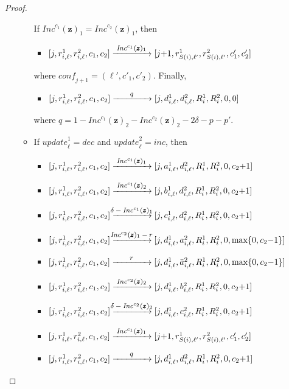 \documentclass[a4paper,UKenglish,cleveref, autoref, thm-restate]{lipics-v2021}
\newcommand{\tran}[1]{\xrightarrow{\makebox[4em]{\footnotesize$#1$}}}
\newcommand{\INC}{\mathit{Inc}}
\renewcommand{\vec}[1]{\pmb{#1}}
\newcommand{\update}{\textit{update}}
\newcommand{\Dec}{\textit{dec}}
\newcommand{\Inc}{\textit{inc}}
\newcommand{\conf}{\textit{conf}}
\newcommand{\vv}[1]{\INC^{#1}(\vec{z})}
\begin{document}
\begin{proof}
\begin{itemize}
\begin{itemize}
        If $\vv{c_1}_1 = \vv{c_2}_1$, then
        \begin{itemize} 
            \item $[j,r^1_{i,\ell},r^2_{i,\ell},c_1,c_2] \tran{\vv{c_1}_1}  [j{+}1,r^1_{S(i),\ell'},r^2_{S(i),\ell'},c'_1,c'_2]$
           \end{itemize}
        where $\conf_{j+1}= (\ell',c'_1,c'_2)$. Finally,
        \begin{itemize}
            \item $[j,r^1_{i,\ell},r^2_{i,\ell},c_1,c_2] \tran{q} [j,d^1_{i,\ell},d^2_{i,\ell},R_i^1,R_i^2,0,0]$    
         \end{itemize}  
        where $q = 1 - \vv{c_1}_2 - \vv{c_2}_2 - 2\delta - p - p'$.
    \item If $\update_\ell^1 = \Dec$ and $\update_\ell^2 = \Inc$, then
        \begin{itemize}
         \item $[j,r^1_{i,\ell},r^2_{i,\ell},c_1,c_2] \tran{\vv{c_1}_1} 
                [j,a^1_{i,\ell},d^2_{i,\ell},R_i^1,R_i^2,0,c_2{+}1]$
         \item $[j,r^1_{i,\ell},r^2_{i,\ell},c_1,c_2] \tran{\vv{c_1}_2} 
                [j,b^1_{i,\ell},d^2_{i,\ell},R_i^1,R_i^2,0,c_2{+}1]$    
         \item $[j,r^1_{i,\ell},r^2_{i,\ell},c_1,c_2] \tran{\delta- \vv{c_1}_1}
                [j,c^1_{i,\ell},d^2_{i,\ell},R_i^1,R_i^2,0,c_2{+}1]$
\item $[j,r^1_{i,\ell},r^2_{i,\ell},c_1,c_2] \tran{\vv{c_2}_1 - r} 
                [j,d^1_{i,\ell},a^2_{i,\ell},R_i^1,R_i^2,0,\max\{0,c_2{-}1\}]$
         \item $[j,r^1_{i,\ell},r^2_{i,\ell},c_1,c_2] \tran{r} 
                [j,d^1_{i,\ell},\bar{a}^2_{i,\ell},R_i^1,R_i^2,0,\max\{0,c_2{-}1\}]$
         \item $[j,r^1_{i,\ell},r^2_{i,\ell},c_1,c_2] \tran{\vv{c_2}_2} 
                [j,d^1_{i,\ell},b^2_{i,\ell},R_i^1,R_i^2,0,c_2{+}1]$    
         \item $[j,r^1_{i,\ell},r^2_{i,\ell},c_1,c_2] \tran{\delta- \vv{c_2}_2} 
                [j,d^1_{i,\ell},c^2_{i,\ell},R_i^1,R_i^2,0,c_2{+}1]$
         \item $[j,r^1_{i,\ell},r^2_{i,\ell},c_1,c_2] \tran{\vv{c_1}_1}  
                [j{+}1,r^1_{S(i),\ell'},r^2_{S(i),\ell'},c'_1,c'_2]$
         \item $[j,r^1_{i,\ell},r^2_{i,\ell},c_1,c_2] \tran{q} [j,d^1_{i,\ell},d^2_{i,\ell},R_i^1,R_i^2,0,c_2{+}1]$    
\end{itemize}

\end{itemize}
\end{itemize}
\end{proof}
\end{document}
